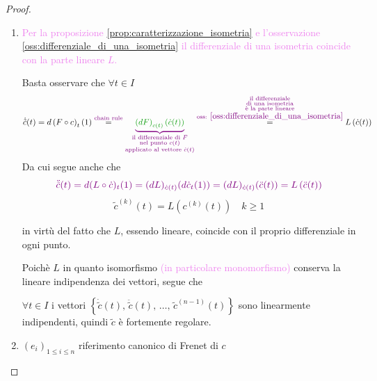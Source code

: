         \begin{proof}
        \mbox{}

        \begin{enumerate}
            \item \textcolor{violet}{Per la proposizione \ref{prop:caratterizzazione_isometria} e l'osservazione \ref{oss:differenziale_di_una_isometria} il differenziale di una isometria coincide
            con la parte lineare $L$.}
            
            Basta osservare che $\forall t \in I$ 
            \[ \dot{\tilde{c}}(t) = d \left(F \circ c\right)_t (1) \overset{\textcolor{violet}{\text{chain rule}}}{=} \textcolor{violet}{\underbrace{\textcolor{verde}{\left(dF\right)_{c(t)} \left( \dot{c}(t) \right)}}_{\substack{\text{il differenziale di $F$} \\ \text{nel punto $c(t)$} \\ \text{applicato al vettore $\dot{c}(t)$}}}} \overset{\textcolor{violet}{\substack{\text{il differenziale} \\ \text{di una isometria} \\ \text{è la parte lineare} \\ \text{oss: } \ref{oss:differenziale_di_una_isometria} }}}{=} L \left( \dot{c}(t) \right) \]
            Da cui segue anche che 
            \[ \color{violet} \ddot{\tilde{c}}(t) = d(L \circ \dot{c})_t(1)=(dL)_{\dot{c}(t)}(d\dot{c}_t(1)) = (dL)_{\dot{c}(t)}(\ddot{c}(t)) = L\left(\ddot{c}(t)\right) \]
            \begin{equation}
            \label{eq:dimostrazione_funzioni_di_curvatura_invarianti_metrici_1} 
            \tilde{c}^{(k)}(t) = L \left( c^{(k)}(t) \right) \quad k \geq 1
            \end{equation}

            in virtù del fatto che $L$, essendo lineare, coincide con il proprio differenziale in ogni punto.

            Poichè $L$ in quanto isomorfismo \textcolor{violet}{(in particolare monomorfismo)} conserva la lineare indipendenza dei vettori, segue che
            
            $\forall t \in I$ i vettori
            $\left\{ \dot{\tilde{c}}(t), \, \ddot{\tilde{c}}(t), \, \dots, \, \tilde{c}^{(n-1)}(t) \right\}$ sono linearmente indipendenti, quindi $\tilde{c}$ è fortemente regolare.
            \item $\left(e_i\right)_{1 \leq i \leq n}$ riferimento canonico di Frenet di $c$
            

\end{enumerate}
\end{proof}
